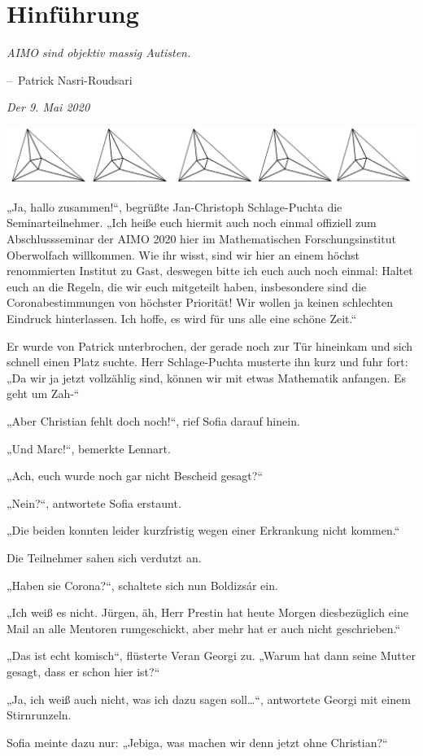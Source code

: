 \documentclass[oneside]{memoir}
\makeatletter
\newcommand{\parasep}{
\bigskip
\bigskip
\begin{center} 
   \includegraphics[scale=.08]{parasep5.jpg} 
\end{center}
\bigskip
\bigskip
}
\newenvironment{chapquote}[2][2em]
  {\setlength{\@tempdima}{#1}%
   \def\chapquote@author{#2}%
   \parshape 1 \@tempdima \dimexpr\textwidth-2\@tempdima\relax%
   \itshape}
  {\par\normalfont\hfill--\ \chapquote@author\hspace*{\@tempdima}\par\bigskip}
\makeatother
\begin{document}
\chapter{Hinführung} %
\begin{chapquote}{Patrick Nasri-Roudsari}
\glqq AIMO sind objektiv massig Autisten.\grqq
\end{chapquote}
\textit{Der 9. Mai 2020}



\parasep

„Ja, hallo zusammen!“, begrüßte Jan-Christoph Schlage-Puchta die Seminarteilnehmer. „Ich heiße euch hiermit auch noch einmal offiziell zum Abschlussseminar der AIMO 2020 hier im Mathematischen Forschungsinstitut Oberwolfach willkommen. Wie ihr wisst, sind wir hier an einem höchst renommierten Institut zu Gast, deswegen bitte ich euch auch noch einmal: Haltet euch an die Regeln, die wir euch mitgeteilt haben, insbesondere sind die Coronabestimmungen von höchster Priorität! Wir wollen ja keinen schlechten Eindruck hinterlassen. Ich hoffe, es wird für uns alle eine schöne Zeit.“

Er wurde von Patrick unterbrochen, der gerade noch zur Tür hineinkam und sich schnell einen Platz suchte. Herr Schlage-Puchta musterte ihn kurz und fuhr fort: „Da wir ja jetzt vollzählig sind, können wir mit etwas Mathematik anfangen. Es geht um Zah-“

„Aber Christian fehlt doch noch!“, rief Sofia darauf hinein.

„Und Marc!“, bemerkte Lennart.

„Ach, euch wurde noch gar nicht Bescheid gesagt?“

„Nein?“, antwortete Sofia erstaunt.

„Die beiden konnten leider kurzfristig wegen einer Erkrankung nicht kommen.“

Die Teilnehmer sahen sich verdutzt an.

„Haben sie Corona?“, schaltete sich nun Boldizsár ein.

„Ich weiß es nicht. Jürgen, äh, Herr Prestin hat heute Morgen diesbezüglich eine Mail an alle Mentoren rumgeschickt, aber mehr hat er auch nicht geschrieben.“

„Das ist echt komisch“, flüsterte Veran Georgi zu. „Warum hat dann seine Mutter gesagt, dass er schon hier ist?“

„Ja, ich weiß auch nicht, was ich dazu sagen soll\ldots“, antwortete Georgi mit einem Stirnrunzeln.

Sofia meinte dazu nur: „Jebiga, was machen wir denn jetzt ohne Christian?“
\end{document}
